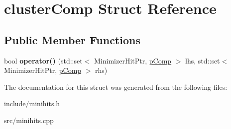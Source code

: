 \hypertarget{structclusterComp}{}\section{cluster\+Comp Struct Reference}
\label{structclusterComp}
\subsection*{Public Member Functions}
\begin{DoxyCompactItemize}
\item 
\mbox{\label{structclusterComp_a086ed2a91af6dad878f8bcec610a9f68}} 
bool {\bfseries operator()} (std\+::set$<$ Minimizer\+Hit\+Ptr, \hyperlink{structpComp}{p\+Comp} $>$ lhs, std\+::set$<$ Minimizer\+Hit\+Ptr, \hyperlink{structpComp}{p\+Comp} $>$ rhs)
\end{DoxyCompactItemize}


The documentation for this struct was generated from the following files\+:\begin{DoxyCompactItemize}
\item 
include/minihits.\+h\item 
src/minihits.\+cpp\end{DoxyCompactItemize}
